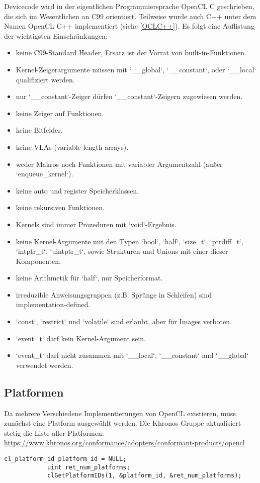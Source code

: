 		Devicecode wird in der eigentlichen Programmiersprache OpenCL C geschrieben, die sich im Wesentlichen an C99 orientiert. Teilweise wurde auch C++ unter dem Namen OpenCL C++ implementiert (siehe \ref{OCLC++}). Es folgt eine Auflistung der wichtigsten Einschränkungen:
		\begin{itemize}
		\item keine C99-Standard Header, Ersatz ist der Vorrat von built-in-Funktionen.
		\item Kernel-Zeigerargumente müssen mit \li`__global`, \li`__constant`, oder \li`__local` qualifiziert werden.  
		\item nur \li`__constant`-Zeiger dürfen \li`__constant`-Zeigern zugewiesen werden.
		\item keine Zeiger auf Funktionen.
		\item keine Bitfelder.
		\item keine VLAs (variable length arrays).
		\item weder Makros noch Funktionen mit variabler Argumentzahl (außer \li`enqueue_kernel`).
		\item keine auto und register Speicherklassen.
		\item keine rekursiven Funktionen.
		\item \Glspl{Kernel} sind immer Prozeduren mit \li`void`-Ergebnis.
		\item keine \Gls{Kernel}-Argumente mit den Typen \li`bool`, \li`half`, \li`size_t`, \li`ptrdiff_t`, \li`intptr_t`, \li`uintptr_t`, sowie Strukturen und Unions mit einer dieser Komponenten.
		\item keine Arithmetik für \li`half`, nur Speicherformat.
		\item irreduzible Anweisungsgruppen (z.B. Sprünge in Schleifen) sind implementation-defined.
		\item \li`const`, \li`restrict` und \li`volatile` sind erlaubt, aber für Images verboten.
		\item \li`event_t` darf kein \Gls{Kernel}-Argument sein.
		\item  \li`event_t` darf nicht zusammen mit \li`__local`, \li`__constant` and \li`__global` verwendet werden.
		\end{itemize}
		
			\subsection{Platformen}
			Da mehrere Verschiedene Implementierungen von OpenCL existieren, muss zunächst eine \Gls{Platform} ausgewählt werden. Die Khronos Gruppe aktualisiert stetig die Liste aller Platformen: \url{https://www.khronos.org/conformance/adopters/conformant-products/opencl}
			\begin{lstlisting}[caption=~Platformabfrage]
			cl_platform_id platform_id = NULL;
			uint ret_num_platforms;
			clGetPlatformIDs(1, &platform_id, &ret_num_platforms);
			\end{lstlisting}

